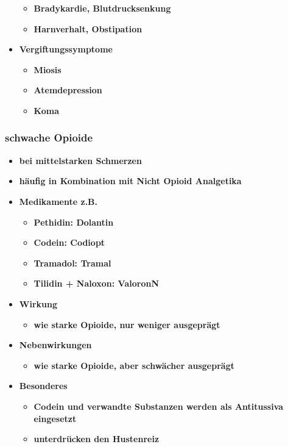 \begin{itemize}
			\begin{itemize}
				\item \textbf{Bradykardie, Blutdrucksenkung}
				\item \textbf{Harnverhalt, Obstipation}
			\end{itemize}
		\item \textbf{Vergiftungssymptome}
			\begin{itemize}
				\item \textbf{Miosis}
				\item \textbf{Atemdepression}
				\item \textbf{Koma}
			\end{itemize}
	\end{itemize}
		
\subsubsection{schwache Opioide}
	\begin{itemize}
		\item \textbf{bei mittelstarken Schmerzen}
		\item \textbf{häufig in Kombination mit Nicht Opioid Analgetika}
		\item \textbf{Medikamente z.B.}
			\begin{itemize}
				\item \textbf{Pethidin:  Dolantin\textregistered}
				\item \textbf{Codein:  Codiopt\textregistered}
				\item \textbf{Tramadol: Tramal\textregistered}
				\item \textbf{Tilidin + Naloxon:  Valoron\textregistered N}
			\end{itemize}
		\item \textbf{Wirkung}
			\begin{itemize}
				\item \textbf{wie starke Opioide, nur weniger ausgeprägt}
			\end{itemize}
		\item \textbf{Nebenwirkungen}
			\begin{itemize}
				\item \textbf{wie starke Opioide, aber schwächer ausgeprägt}
			\end{itemize}
		\item \textbf{Besonderes}
			\begin{itemize}
				\item \textbf{Codein und verwandte Substanzen werden als Antitussiva eingesetzt}
				\item \textbf{unterdrücken den Hustenreiz}
			\end{itemize}
	\end{itemize}
